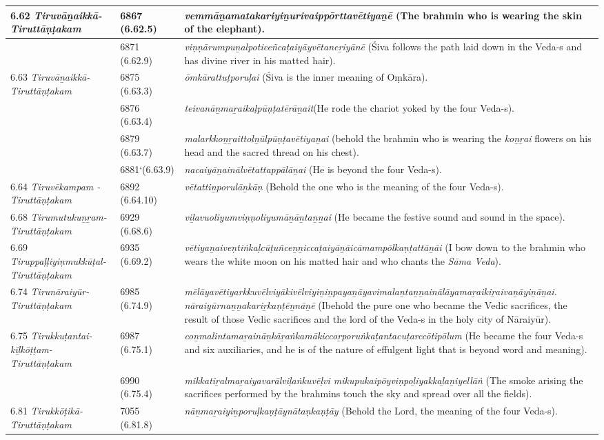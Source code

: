 \begin{longtable}{|m{2.7cm}|m{2.7cm}|>{\raggedright}m{3.1cm}|}
\hline
6.62 \textit{Tiruvāṉaikkā- Tiruttāṇṭakam} & 6867 (6.62.5) & \textit{vemmāṉamatakariyi\-ṉurivaippōrttavētiyaṉē} (The brahmin who is wearing the skin of the elephant). \tabularnewline
\hline
 & 6871 (6.62.9) & \textit{viṇṇārumpuṉalpoti\-ceñcaṭaiyāyvētaneṟi\-yānē} (Śiva\index{Siva@Śiva} follows the path laid down in the Veda-s and has divine river in his matted hair). \tabularnewline
\hline
6.63 \textit{Tiruvāṉaikkā- Tiruttāṇṭakam} & 6875 (6.63.3) & \textit{ōmkārattuṭporuḷai} (Śiva is the inner meaning of Oṃkāra\index{Omkara@Oṃkāra}). \tabularnewline
\hline
 & 6876 (6.63.4) & \textit{teivanāṉmaṟaikaḷpūṇ\-ṭatērāṉait}(He rode the chariot yoked by the four Veda-s). \tabularnewline
\hline
 & 6879 (6.63.7) & \textit{malarkkoṉṟaittolṉūl\-pūṇṭavētiyaṉai} (behold the brahmin who is wearing the \textit{koṉṟai} flowers on his head and the sacred thread on his chest). \tabularnewline
\hline
 & 6881`(6.63.9) & \textit{nacaiyāṉainālvētatta\-ppālāṉai} (He is beyond the four Veda-s). \tabularnewline
\hline
6.64 \textit{Tiruvēkampam - Tiruttāṇṭakam} & 6892 (6.64.10) & \textit{vētattiṉporulāṉkāṇ} (Behold the one who is the meaning of the four Veda-s). \tabularnewline
\hline
6.68 \textit{Tirumutukuṉ\-ṟam-Tiruttāṇ\-ṭakam} & 6929 (6.68.6) & \textit{viḻavuoliyumviṇṇoli\-yumāṉāṉtaṉṉai} (He became the festive sound and sound in the space). \tabularnewline
\hline
6.69 \textit{Tiruppaḷḷiyiṇmu\-kkūṭal-Tiruttāṇ\-ṭakam} & 6935 (6.69.2) & \textit{vētiyaṉaiveṇtiṅkaḷcū\-ṭuñceṉṉiccaṭaiyāṉāi\-cāmampōlkaṇṭattāṉāi} (I bow down to the brahmin who wears the white moon on his matted hair  and who chants the \textit{Sāma Veda}). \tabularnewline
\hline
6.74 \textit{Tirunāraiyūr- Tiruttāṇṭakam} & 6985 (6.74.9) & \textit{mēlāyavētiyarkkuvēl\-viyākivēlviyiṉiṉpaya\-ṉāyavimalaṉtaṉṉai\-nālāyamaṟaikiṟaiva\-ṉāyiṉāṉai. nāraiyūrnaṉṉakariṟkaṇṭēṉnāṉē} (Ibehold the pure one who became the Vedic sacrifices\index{Vedic sacrifices}, the result of those Vedic sacrifices and the lord of the Veda-s in the holy city of Nāraiyūr). \tabularnewline
\hline
6.75 \textit{Tirukkuṭantai-kīḻkōṭṭam- Tiruttāṇ\-ṭakam} & 6987 (6.75.1) & \textit{coṉmalintamaṟaināṉ\-kāṟaṅkamākiccoṟpo\-ruṅkaṭantacuṭarccōti\-pōlum} (He became the four Veda-s and six auxiliaries, and he is of the nature of effulgent light that is beyond word and meaning). \tabularnewline
\hline
 & 6990 (6.75.4) & \textit{mikkatiṟalmaṟaiyava\-rālviḷaṅkuvēḷvi mikupukaipōyviṇpoḻi\-yakkaḻaṉiyellāṅ}  (The smoke arising the sacrifices performed by the brahmins touch the sky and spread over all the fields). \tabularnewline
\hline
6.81 \textit{Tirukkōṭikā- Tiruttāṇṭakam} & 7055 (6.81.8) & \textit{nāṉmaṟaiyiṉporuḷkaṇ\-ṭāynātaṇkaṇṭāy} (Behold  the Lord, the meaning of the four Veda-s). \tabularnewline

\end{longtable}
